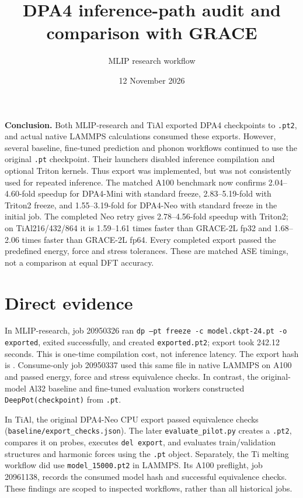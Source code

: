 \documentclass[11pt,a4paper]{article}
\title{DPA4 inference-path audit and comparison with GRACE}
\author{MLIP research workflow}
\date{12 November 2026}
\begin{document}
\maketitle
\noindent\textbf{Conclusion.} Both MLIP-research and TiAl exported DPA4 checkpoints to
\texttt{.pt2}, and actual native LAMMPS calculations consumed these exports.
However, several baseline, fine-tuned prediction and phonon workflows continued
to use the original \texttt{.pt} checkpoint. Their launchers disabled inference
compilation and optional Triton kernels. Thus export was implemented, but was not
consistently used for repeated inference. The matched A100 benchmark now confirms
2.04--4.60-fold speedup for DPA4-Mini with standard freeze, 2.83--5.19-fold with
Triton2 freeze, and 1.55--3.19-fold for DPA4-Neo with standard freeze in the
initial job. The completed Neo retry gives 2.78--4.56-fold speedup with Triton2;
on TiAl216/432/864 it is 1.59--1.61 times faster than GRACE-2L fp32 and
1.68--2.06 times faster than GRACE-2L fp64. Every completed export passed the
predefined energy, force and stress tolerances. These are matched ASE timings,
not a comparison at equal DFT accuracy.

\section*{Direct evidence}
In MLIP-research, job 20950326 ran
\texttt{dp --pt freeze -c model.ckpt-24.pt -o exported}, exited successfully,
and created \texttt{exported.pt2}; export took 242.12 seconds. This is
one-time compilation cost, not inference latency. The export hash is
.
Consume-only job 20950337 used this same file in native LAMMPS on A100 and passed
energy, force and stress equivalence checks. In contrast, the original-model
Al32 baseline and fine-tuned evaluation workers constructed
\texttt{DeepPot(checkpoint)} from \texttt{.pt}.

In TiAl, the original DPA4-Neo CPU export passed equivalence checks
(\texttt{baseline/export\_checks.json}). The later
\texttt{evaluate\_pilot.py} creates a \texttt{.pt2}, compares it on probes,
executes \texttt{del export}, and evaluates train/validation structures and
harmonic forces using the \texttt{.pt} object. Separately, the Ti melting
workflow did use \texttt{model\_15000.pt2} in LAMMPS. Its A100 preflight,
job 20961138, records the consumed model hash and successful equivalence checks.
These findings are scoped to inspected workflows, rather than all historical jobs.
\end{document}
